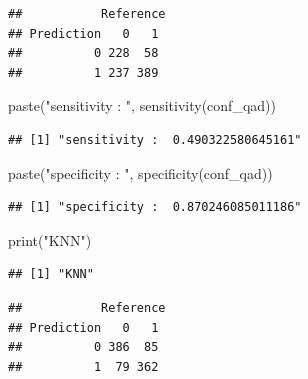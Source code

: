 \documentclass[
]{article}
\newenvironment{Shaded}{\begin{snugshade}}{\end{snugshade}}
\newcommand{\AttributeTok}[1]{\textcolor[rgb]{0.77,0.63,0.00}{#1}}
\newcommand{\FunctionTok}[1]{\textcolor[rgb]{0.00,0.00,0.00}{#1}}
\newcommand{\NormalTok}[1]{#1}
\newcommand{\OtherTok}[1]{\textcolor[rgb]{0.56,0.35,0.01}{#1}}
\newcommand{\SpecialCharTok}[1]{\textcolor[rgb]{0.00,0.00,0.00}{#1}}
\newcommand{\StringTok}[1]{\textcolor[rgb]{0.31,0.60,0.02}{#1}}
\begin{document}
\begin{verbatim}
##           Reference
## Prediction   0   1
##          0 228  58
##          1 237 389
\end{verbatim}

\begin{Shaded}
\begin{Highlighting}[]
\FunctionTok{paste}\NormalTok{(}\StringTok{"sensitivity : "}\NormalTok{, }\FunctionTok{sensitivity}\NormalTok{(conf\_qad))}
\end{Highlighting}
\end{Shaded}

\begin{verbatim}
## [1] "sensitivity :  0.490322580645161"
\end{verbatim}

\begin{Shaded}
\begin{Highlighting}[]
\FunctionTok{paste}\NormalTok{(}\StringTok{"specificity : "}\NormalTok{, }\FunctionTok{specificity}\NormalTok{(conf\_qad))}
\end{Highlighting}
\end{Shaded}

\begin{verbatim}
## [1] "specificity :  0.870246085011186"
\end{verbatim}

\begin{Shaded}
\begin{Highlighting}[]
\FunctionTok{print}\NormalTok{(}\StringTok{"KNN"}\NormalTok{)}
\end{Highlighting}
\end{Shaded}

\begin{verbatim}
## [1] "KNN"
\end{verbatim}

\begin{Shaded}
\end{Shaded}

\begin{verbatim}
##           Reference
## Prediction   0   1
##          0 386  85
##          1  79 362
\end{verbatim}
\end{document}
